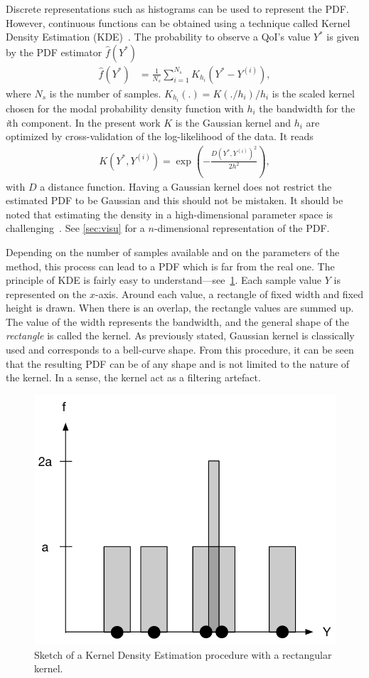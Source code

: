 Discrete representations such as histograms can be used to represent the PDF. However, continuous functions can be obtained using a technique called Kernel Density Estimation (KDE)~\cite{Wand1995}. The probability to observe a QoI's value $Y^*$ is given by the PDF estimator $\hat{f}(Y^*)$
\begin{align}
\hat{f}(Y^*)&= \frac{1}{N_{s}}\sum_{i=1}^{N_{s}} K_{h_i}(Y^*-Y^{(i)}),
\end{align}
\noindent where $N_s$ is the number of samples. $K_{h_i}(.) = K(./h_i)/h_i$ is the scaled kernel chosen for the modal probability density function with $h_{i}$ the bandwidth for the \emph{i}th component. In the present work $K$ is the Gaussian kernel and $h_{i}$ are optimized by cross-validation of the log-likelihood of the data. It reads
\begin{align}
K\left(Y^*,Y^{(i)}\right) = \exp\left( - \frac{D\left(Y^*,Y^{(i)}\right)^2}{2h^2} \right), \label{eq:kde}
\end{align}
\noindent with $D$ a distance function. Having a Gaussian kernel does not restrict the estimated PDF to be Gaussian and this should not be mistaken. It should be noted that estimating the density in a high-dimensional parameter space is challenging~\citep{Scholkopf1999,Scott2015}. See \cref{sec:visu} for a $n$-dimensional representation of the PDF.

Depending on the number of samples available and on the parameters of the method, this process can lead to a PDF which is far from the real one. The principle of KDE is fairly easy to understand---see~\cref{fig:kde}. Each sample value $Y$ is represented on the $x$-axis. Around each value, a rectangle of fixed width and fixed height is drawn. When there is an overlap, the rectangle values are summed up. The value of the width represents the bandwidth, and the general shape of the \emph{rectangle} is called the kernel. As previously stated, Gaussian kernel is classically used and corresponds to a bell-curve shape. From this procedure, it can be seen that the resulting PDF can be of any shape and is not limited to the nature of the kernel. In a sense, the kernel act as a filtering artefact.

\begin{figure}[!ht]
\centering
\includegraphics[width=0.6\linewidth,keepaspectratio]{fig/literature/kde.pdf}
\caption{Sketch of a Kernel Density Estimation procedure with a rectangular kernel.}
\label{fig:kde}
\end{figure}

